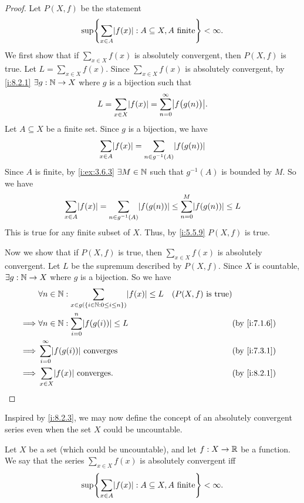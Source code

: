 \begin{proof}
  Let \(P(X, f)\) be the statement
  \[
    \sup\set{\sum_{x \in A} \abs{f(x)} : A \subseteq X, A \text{ finite}} < \infty.
  \]
  We first show that if \(\sum_{x \in X} f(x)\) is absolutely convergent, then \(P(X, f)\) is true.
  Let \(L = \sum_{x \in X} f(x)\).
  Since \(\sum_{x \in X} f(x)\) is absolutely convergent, by \cref{i:8.2.1} \(\exists g : \mathbb{N} \to X\) where \(g\) is a bijection such that
  \[
    L = \sum_{x \in X} \abs{f(x)} = \sum_{n = 0}^\infty \abs{f\big(g(n)\big)}.
  \]
  Let \(A \subseteq X\) be a finite set.
  Since \(g\) is a bijection, we have
  \[
    \sum_{x \in A} \abs{f(x)} = \sum_{n \in g^{-1}(A)} \abs{f(g(n))}
  \]
  Since \(A\) is finite, by \cref{i:ex:3.6.3} \(\exists M \in \mathbb{N}\) such that \(g^{-1}(A)\) is bounded by \(M\).
  So we have
  \[
    \sum_{x \in A} \abs{f(x)} = \sum_{n \in g^{-1}(A)} \abs{f(g(n))} \leq \sum_{n = 0}^M \abs{f(g(n))} \leq L
  \]
  This is true for any finite subset of \(X\).
  Thus, by \cref{i:5.5.9} \(P(X, f)\) is true.

  Now we show that if \(P(X, f)\) is true, then \(\sum_{x \in X} f(x)\) is absolutely convergent.
  Let \(L\) be the supremum described by \(P(X, f)\).
  Since \(X\) is countable, \(\exists g : \mathbb{N} \to X\) where \(g\) is a bijection.
  So we have
  \begin{align*}
             & \forall n \in \N : \sum_{x \in g(\set{i \in \N : 0 \leq i \leq n})} \abs{f(x)} \leq L & (P(X, f) \text{ is true})                \\
    \implies & \forall n \in \N : \sum_{i = 0}^n \abs{f(g(i))} \leq L                                &                           & \by{i:7.1.6} \\
    \implies & \sum_{i = 0}^\infty \abs{f(g(i))} \text{ converges}                                   &                           & \by{i:7.3.1} \\
    \implies & \sum_{x \in X} \abs{f(x)} \text{ converges}.                                          &                           & \by{i:8.2.1}
  \end{align*}
\end{proof}

\begin{note}
  Inspired by \cref{i:8.2.3}, we may now define the concept of an absolutely convergent series even when the set \(X\) could be uncountable.
\end{note}

\begin{defn}\label{i:8.2.4}
  Let \(X\) be a set (which could be uncountable), and let \(f : X \to \mathbb{R}\) be a function.
  We say that the series \(\sum_{x \in X} f(x)\) is absolutely convergent iff
  \[
    \sup\set{\sum_{x \in A} \abs{f(x)} : A \subseteq X, A \text{ finite}} < \infty.
  \]
\end{defn}


